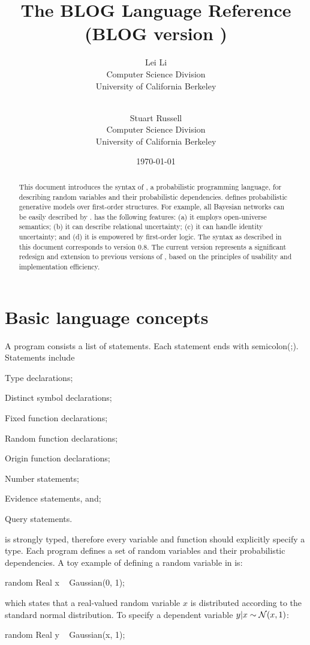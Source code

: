 \documentclass[12pt]{article}
\title{The BLOG Language Reference  \\
{\large (BLOG version \blogversion)}
}
\author{Lei Li\\
              Computer Science Division\\
              University of California Berkeley\\
               \email{leili@cs.berkeley.edu}\\
\and
               Stuart Russell\\
              Computer Science Division\\
              University of California Berkeley\\
               \email{russell@cs.berkeley.edu}
               }
\date{\today}
\newcommand{\blogversion}{0.8\xspace}
\begin{document}
\maketitle


\begin{abstract}
This document introduces the syntax of \bl, a probabilistic programming language, for describing random variables and their probabilistic dependencies.  
\bl defines probabilistic generative models over first-order structures. For example, all Bayesian networks can be easily described by \bl.  
\bl has the following features: 
(a) it employs open-universe semantics;
(b) it can describe relational uncertainty;
(c) it can handle identity uncertainty; and
(d) it is empowered by first-order logic.
The syntax as described in this document corresponds to \bl version \blogversion. The current version represents a significant redesign and extension to previous versions of \bl, based on the principles of usability and implementation efficiency.
\end{abstract}

\clearpage

\tableofcontents

\clearpage

\section{Basic language concepts}
A \bl program consists a list of statements.
Each statement ends with semicolon(;). 
Statements include 
\begin{enumerate*}
\item Type declarations; 
\item Distinct symbol declarations;
\item Fixed function declarations;
\item Random function declarations;
\item Origin function declarations;
\item Number statements;
\item Evidence statements, and;
\item Query statements.
\end{enumerate*}

\bl is strongly typed, therefore every variable and function should explicitly specify a type.
Each \bl program defines a set of random variables and their probabilistic dependencies. 
A toy example of defining a random variable in \bl is:

\begin{blogcode}
random Real x ~ Gaussian(0, 1);
\end{blogcode}
which states that a real-valued random variable $x$ is distributed according to the standard normal distribution. 
To specify a dependent variable $y | x \sim \mathcal{N}(x, 1)$:
\begin{blogcode}
random Real y ~ Gaussian(x, 1);
\end{blogcode}
\end{document}
